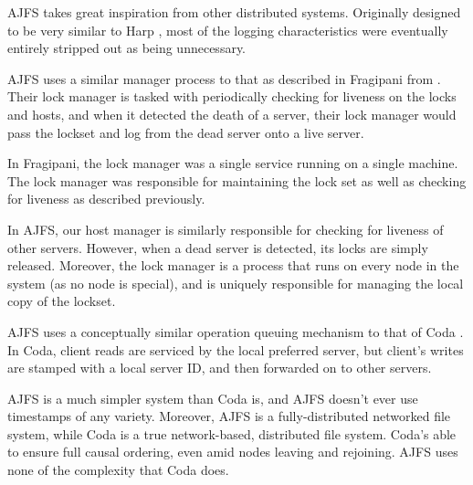 
AJFS takes great inspiration from other distributed systems. Originally designed
to be very similar to Harp \cite{LGG91}, most of the logging characteristics
were eventually entirely stripped out as being unnecessary.

AJFS uses a similar manager process to that as described in Fragipani from
\cite{TML97}. Their lock manager is tasked with periodically checking for
liveness on the locks and hosts, and when it detected the death of a server,
their lock manager would pass the lockset and log from the dead server onto a
live server.

In Fragipani, the lock manager was a single service running on a single
machine. The lock manager was responsible for maintaining the lock set as well
as checking for liveness as described previously.

In AJFS, our host manager is similarly responsible for checking for liveness of
other servers. However, when a dead server is detected, its locks are simply
released. Moreover, the lock manager is a process that runs on every node in the
system (as no node is special), and is uniquely responsible for managing the
local copy of the lockset.

AJFS uses a conceptually similar operation queuing mechanism to that of Coda
\cite{KS92}. In Coda, client reads are serviced by the local preferred server,
but client's writes are stamped with a local server ID, and then forwarded on to
other servers.

AJFS is a much simpler system than Coda is, and AJFS doesn't ever use timestamps
of any variety. Moreover, AJFS is a fully-distributed networked file system,
while Coda is a true network-based, distributed file system. Coda's able to
ensure full causal ordering, even amid nodes leaving and rejoining. AJFS uses
none of the complexity that Coda does.
